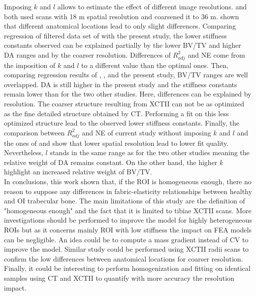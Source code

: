 \documentclass[a4paper,fleqn]{DC_ArtStyle}
\begin{document}
Imposing $k$ and $l$ allows to estimate the effect of different image resolutions.  \citeauthor{Panyasantisuk2015}\cite{Panyasantisuk2015} and \citeauthor{Gross2013}\cite{Gross2013} both used scans with 18 \si{\micro}m spatial resolution and coarsened it to 36 \si{\micro}m. \citeauthor{Gross2013}\cite{Gross2013} shown that different anatomical locations lead to only slight differences. Comparing regression of filtered data set of \citeauthor{Panyasantisuk2015}\cite{Panyasantisuk2015} with the present study, the lower stiffness constants observed can be explained partially by the lower BV/TV and higher DA ranges and by the coarser resolution. Differences of $R^2_{adj}$ and NE come from the imposition of $k$ and $l$ to a different value than the optimal ones. Then, comparing regression results of \citeauthor{Panyasantisuk2015}\cite{Panyasantisuk2015}, \citeauthor{Gross2013}\cite{Gross2013}, and the present study, BV/TV ranges are well overlapped. DA is still higher in the present study and the stiffness constants remain lower than for the two other studies. Here, differences can be explained by resolution. The coarser structure resulting from XCTII can not be as optimized as the fine detailed structure obtained by \si{\micro}CT. Performing a fit on this less optimized structure lead to the observed lower stiffness constants. Finally, the comparison between $R^2_{adj}$ and NE of current study without imposing $k$ and $l$ and the ones of \citeauthor{Panyasantisuk2015}\cite{Panyasantisuk2015} and  \citeauthor{Gross2013}\cite{Gross2013} show that lower spatial resolution lead to lower fit quality. Nevertheless, $l$ stands in the same range as for the two other studies meaning the relative weight of DA remains constant. On the other hand, the higher $k$ highlight an increased relative weight of BV/TV.\\

In conclusions, this work shown that, if the ROI is homogeneous enough, there no reason to suppose any differences in fabric-elasticity relationships between healthy and OI trabecular bone. The main limitations of this study are the definition of "homogeneous enough" and the fact that it is limited to tibiae XCTII scans. More investigations should be performed to improve the model for highly heterogeneous ROIs but as it concerns mainly ROI with low stiffness the impact on FEA models can be negligible. An idea could be to compute a mass gradient instead of CV to improve the model. Similar study could be performed using XCTII radii scans to confirm the low differences between anatomical locations for coarser resolution. Finally, it could be interesting to perform homogenization and fitting on identical samples using \si{\micro}CT and XCTII to quantify with more accuracy the resolution impact.
\end{document}
